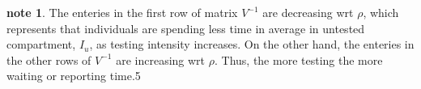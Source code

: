 \documentclass[12pt]{article}
\newcommand{\Rnum}{\mathcal{R}_0}
\theoremstyle{definition} %
\newtheorem{prop}{Proposition}
\newtheorem{note}{note}
\begin{document}
\begin{note}
The enteries in the first row of matrix $V^{-1}$ are decreasing wrt $\rho$, which represents that individuals are spending less time in average in untested compartment, $I_u$, as testing intensity increases. On the other hand, the enteries in the other rows of $V^{-1}$ are increasing wrt $\rho$. Thus, the more testing the more waiting or reporting time.5
\end{note}
% 
% 
% 
\end{document}
